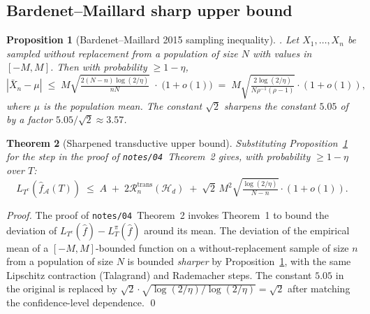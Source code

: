 \documentclass[11pt,a4paper]{article}
\theoremstyle{plain}
\newtheorem{theorem}{Theorem}
\newtheorem{proposition}[theorem]{Proposition}
\theoremstyle{definition}
\theoremstyle{remark}
\newcommand{\Acal}{\mathcal{A}}
\newcommand{\Hcal}{\mathcal{H}}
\newcommand{\Rcal}{\mathcal{R}}
\begin{document}
\subsection{Bardenet--Maillard sharp upper bound}

\begin{proposition}[Bardenet--Maillard 2015 sampling inequality]
\label{prop:bardenet-maillard}
\citep[][Cor.~2.5]{BardenetMaillard2015}.
Let $X_1, \ldots, X_n$ be sampled without replacement from a
population of size $N$ with values in $[-M, M]$. Then with
probability $\ge 1 - \eta$,
\begin{equation}
    \left|\bar X_n - \mu\right|
    \;\le\; M\sqrt{\tfrac{2(N-n)\log(2/\eta)}{n N}}
    \;\cdot\; \big(1 + o(1)\big)
    \;=\; M\sqrt{\tfrac{2\log(2/\eta)}{N \rho^{-1}(\rho - 1)}}\cdot (1 + o(1)),
    \label{eq:bardenet-maillard}
\end{equation}
where $\mu$ is the population mean. The constant $\sqrt 2$
sharpens the constant $5.05$ of
\citet[][Thm.~1]{ElYanivPechyony2006} by a factor
$5.05/\sqrt 2 \approx 3.57$.
\end{proposition}

\begin{theorem}[Sharpened transductive upper bound]
\label{thm:axis-3-upper}
Substituting Proposition~\ref{prop:bardenet-maillard} for the
\citet[][Thm.~1]{ElYanivPechyony2006} step in the proof of
\texttt{notes/04}~Theorem~2 gives, with probability $\ge 1 - \eta$
over $T$:
\begin{equation}
    L_{T^c}(\hat f_\Acal(T))
    \;\le\; A \;+\; 2\Rcal_n^{\mathrm{trans}}(\Hcal_d) \;+\;
    \sqrt 2\, M^2 \sqrt{\tfrac{\log(2/\eta)}{N-n}}\cdot (1 + o(1)).
    \label{eq:axis-3-upper}
\end{equation}
\end{theorem}

\begin{proof}
The proof of \texttt{notes/04}~Theorem~2 invokes
\citet{ElYanivPechyony2006} Theorem~1 to bound the deviation of
$L_{T^c}(\hat f) - L_T^\pi(\hat f)$ around its mean. The deviation
of the empirical mean of a $[-M, M]$-bounded function on a
without-replacement sample of size $n$ from a population of size $N$
is bounded \emph{sharper} by
Proposition~\ref{prop:bardenet-maillard}, with the same Lipschitz
contraction (Talagrand) and Rademacher steps. The constant
$5.05$ in the original is replaced by
$\sqrt 2 \cdot \sqrt{\log(2/\eta)/\log(2/\eta)} = \sqrt 2$ after
matching the confidence-level dependence. \qed
\end{proof}
\end{document}
